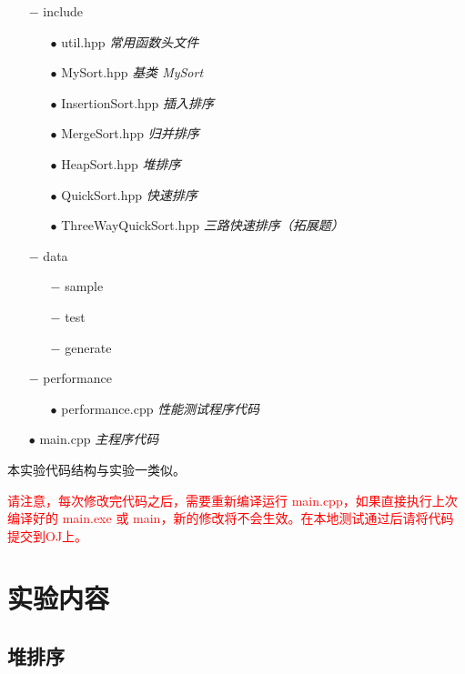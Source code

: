 \documentclass[12pt,a4paper]{article}
\begin{document}
\begin{itemize}[noitemsep]
    \item[$-$] include
        \begin{itemize}[noitemsep]
            \item[$\bullet$] util.hpp \textit{常用函数头文件}
            \item[$\bullet$] MySort.hpp \textit{基类 MySort}
            \item[$\bullet$] InsertionSort.hpp \textit{插入排序}
            \item[$\bullet$] MergeSort.hpp \textit{归并排序}
            \item[$\bullet$] HeapSort.hpp \textit{堆排序}
            \item[$\bullet$] QuickSort.hpp \textit{快速排序}
            \item[$\bullet$] ThreeWayQuickSort.hpp \textit{三路快速排序（拓展题）}
        \end{itemize}
    \item[$-$] data
        \begin{itemize}[noitemsep]
            \item[$-$] sample
            \item[$-$] test
            \item[$-$] generate
        \end{itemize}
    \item[$-$] performance
        \begin{itemize}[noitemsep]
            \item[$\bullet$] performance.cpp \textit{性能测试程序代码}
        \end{itemize}
    \item[$\bullet$] main.cpp \textit{主程序代码}
\end{itemize}

本实验代码结构与实验一类似。

\textcolor{red}{请注意，每次修改完代码之后，需要重新编译运行 main.cpp，如果直接执行上次编译好的 main.exe 或 main，新的修改将不会生效。在本地测试通过后请将代码提交到OJ上。}

\section{实验内容}

\subsection{堆排序}
\end{document}
